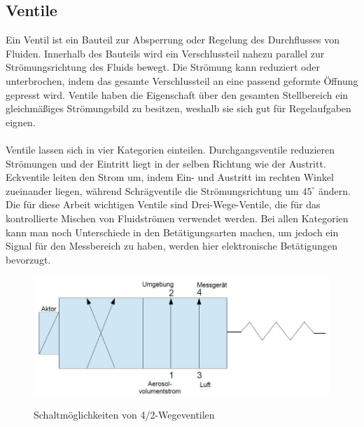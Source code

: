 \subsection{Ventile}
Ein Ventil ist ein Bauteil zur Absperrung oder Regelung des Durchflusses von Fluiden. Innerhalb des Bauteils wird ein Verschlussteil nahezu parallel zur Str\"{o}mungsrichtung des Fluids bewegt. Die Str\"{o}mung kann reduziert oder unterbrochen, indem das gesamte Verschlussteil an eine passend geformte \"{O}ffnung gepresst wird. Ventile haben die Eigenschaft \"{u}ber den gesamten Stellbereich ein gleichm\"{a}{\ss}iges Str\"{o}mungsbild zu besitzen, weshalb sie sich gut f\"{u}r Regelaufgaben eignen.
\\\\
Ventile lassen sich in vier Kategorien einteilen. Durchgangsventile reduzieren Str\"{o}mungen und der Eintritt liegt in der selben Richtung wie der Austritt. Eckventile leiten den Strom um, indem Ein- und Austritt im rechten Winkel zueinander liegen, w\"{a}hrend Schr\"{a}gventile die Str\"{o}mungsrichtung um \(45^\circ\) \"{a}ndern. Die f\"{u}r diese Arbeit wichtigen Ventile sind Drei-Wege-Ventile, die f\"{u}r das kontrollierte Mischen von Fluidstr\"{o}men verwendet werden. Bei allen Kategorien kann man noch Unterschiede in den Bet\"{a}tigungsarten machen, um jedoch ein Signal f\"{u}r den Messbereich zu haben, werden hier elektronische Bet\"{a}tigungen bevorzugt\cite{ventil}.
\begin{figure}[H]
        \myfloatalign
        {\includegraphics[width=.9\linewidth]{gfx/concepts/ventil_feder.jpg}} \quad
        \caption[Schaltm\"{o}glichkeiten von 4/2-Wegeventilen]
        {Schaltm\"{o}glichkeiten von 4/2-Wegeventilen}
        \label{fig:ventil}
\end{figure}
\newpage
